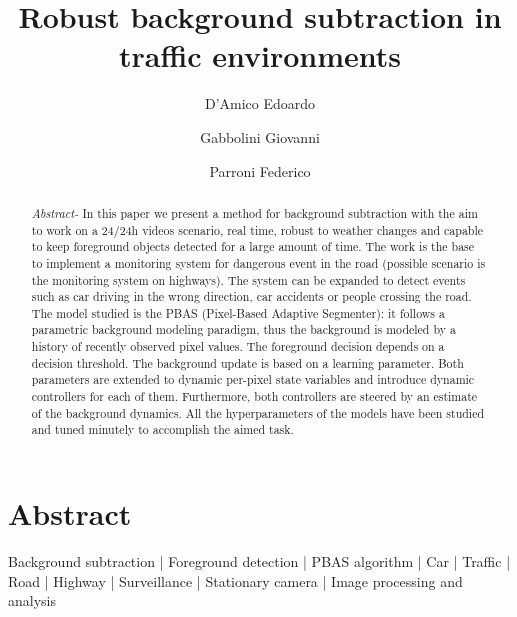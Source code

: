 
\title{Robust background subtraction in traffic environments}

\author[1 \space *]{D'Amico Edoardo}
\author[1 \space *]{Gabbolini Giovanni}
\author[1 \space *]{Parroni Federico}


\maketitle

\section*{Abstract}
\begin{abstract}
\textit{	Abstract-} In this paper we present a method for background subtraction with the aim to work on a 24/24h videos
scenario, real time, robust to weather changes and capable to keep foreground objects detected for a
large amount of time. The work is the base to implement a monitoring system for dangerous event in
the road (possible scenario is the monitoring system on highways). The system can be expanded to
detect events such as car driving in the wrong direction, car accidents or people crossing the road.
The model studied is the PBAS (Pixel-Based Adaptive Segmenter): it follows a parametric background
modeling paradigm, thus the background is modeled by a history of recently observed pixel values.
The foreground decision depends on a decision threshold. The background update is based on a learning
parameter. Both parameters are extended to dynamic per-pixel state variables and introduce dynamic
controllers for each of them. Furthermore, both controllers are steered by an estimate of the background
dynamics. All the hyperparameters of the models have been studied and tuned minutely to accomplish the
aimed task.
\end {abstract}

\begin{keywords}
    Background subtraction | Foreground detection | PBAS algorithm | Car | Traffic | Road | Highway | Surveillance |
    Stationary camera | Image processing and analysis
\end{keywords}


